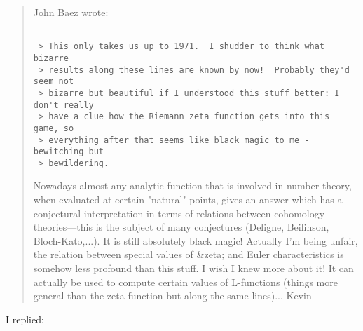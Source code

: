 \begin{quote}
 John Baez wrote:

\begin{verbatim}

 > This only takes us up to 1971.  I shudder to think what bizarre
 > results along these lines are known by now!  Probably they'd seem not
 > bizarre but beautiful if I understood this stuff better: I don't really
 > have a clue how the Riemann zeta function gets into this game, so
 > everything after that seems like black magic to me - bewitching but
 > bewildering.
\end{verbatim}
    
 Nowadays almost any analytic function that is involved in number
 theory, when evaluated at certain "natural" points, gives
 an answer which has a conjectural interpretation in terms
 of relations between cohomology theories---this is the
 subject of many conjectures (Deligne, Beilinson, Bloch-Kato,...).
 It is still absolutely black magic! Actually I'm being unfair,
 the relation between special values of &zeta; and Euler characteristics
 is somehow less profound than this stuff. I wish I knew more about it!
 It can actually be used to compute certain values of L-functions
 (things more general than the zeta function but along the same lines)...
 Kevin
\end{quote}

I replied:

